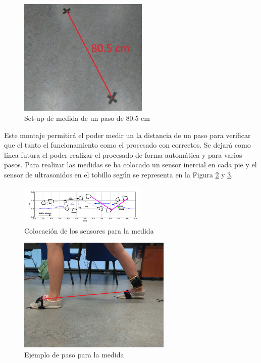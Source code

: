 \begin{figure}[H]
		\centering
		\includegraphics[width=0.55\textwidth]{./graphics/setup_80}
		\caption{Set-up de medida de un paso de 80.5 cm} \label{fig:setup_80}
\end{figure}
	
Este montaje permitirá el poder medir un la distancia de un paso para verificar que el tanto el funcionamiento como el procesado con correctos. Se dejará como línea futura el poder realizar el procesado de forma automática y para varios pasos. Para realizar las medidas se ha colocado un sensor inercial en cada pie y el sensor de ultrasonidos en el tobillo según se representa en la Figura \ref{fig:colocar} y \ref{fig:paso}. 
\begin{figure}[H]
	\centering
	\includegraphics[width=0.55\textwidth]{./graphics/Medida}
	\caption{Colocación de los sensores para la medida} \label{fig:colocar}
\end{figure}
\begin{figure}[H]
	\centering
	\includegraphics[width=0.65\textwidth]{./graphics/paso}
	\caption{Ejemplo de paso para la medida} \label{fig:paso}
\end{figure}


